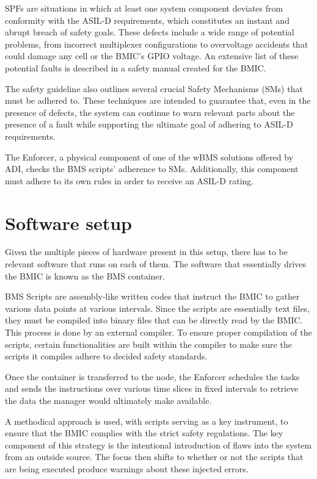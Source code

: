 SPFs are situations in which at least one system component deviates from conformity with the ASIL-D requirements, which constitutes an instant and abrupt breach of safety goals. These defects include a wide range of potential problems, from incorrect multiplexer configurations to overvoltage accidents that could damage any cell or the BMIC's GPIO voltage. An extensive list of these potential faults is described in a safety manual created for the BMIC.

The safety guideline also outlines several crucial Safety Mechanisms (SMs) that must be adhered to. These techniques are intended to guarantee that, even in the presence of defects, the system can continue to warn relevant parts about the presence of a fault while supporting the ultimate goal of adhering to ASIL-D requirements.

The Enforcer, a physical component of one of the wBMS solutions offered by ADI, checks the BMS scripts' adherence to SMs. Additionally, this component must adhere to its own rules in order to receive an ASIL-D rating.

\section{Software setup}

Given the multiple pieces of hardware present in this setup, there has to be relevant software that runs on each of them. The software that essentially drives the BMIC is known as the BMS container.

BMS Scripts are assembly-like written codes that instruct the BMIC to gather various data points at various intervals. Since the scripts are essentially text files, they must be compiled into binary files that can be directly read by the BMIC. This process is done by an external compiler. To ensure proper compilation of the scripts, certain functionalities are built within the compiler to make sure the scripts it compiles adhere to decided safety standards.

Once the container is transferred to the node, the Enforcer schedules the tasks and sends the instructions over various time slices in fixed intervals to retrieve the data the manager would ultimately make available.

A methodical approach is used, with scripts serving as a key instrument, to ensure that the BMIC complies with the strict safety regulations. The key component of this strategy is the intentional introduction of flaws into the system from an outside source. The focus then shifts to whether or not the scripts that are being executed produce warnings about these injected errors.

